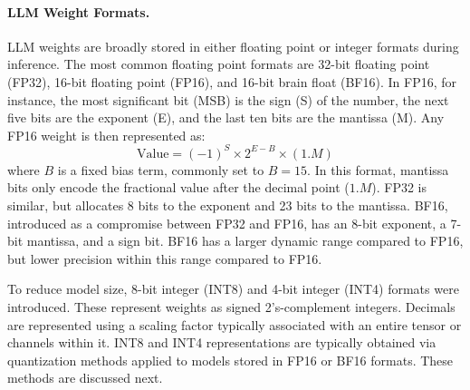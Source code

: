 \paragraph{LLM Weight Formats.} LLM weights are broadly stored in either floating point or integer formats during inference.
The most common floating point formats are 32-bit floating point (FP32), 16-bit floating point (FP16), and 16-bit brain float (BF16). 
In FP16, for instance, the most significant bit (MSB) is the {sign} (S) of the number, the next five bits are the {exponent} (E), and the last ten bits are the {mantissa} (M). 
Any FP16 weight is then represented as: %
\begin{equation}
    \text{Value} = (-1)^S \times 2^{E-B} \times (1.M)
\end{equation}
where $B$ is a fixed bias term, commonly set to $B=15$. In this format, mantissa bits only encode 
the fractional value after the decimal point ($1.M$).
FP32 is similar, but allocates 8 bits to the exponent and 23 bits to the mantissa. 
BF16, introduced as a compromise between FP32 and FP16, has an 8-bit exponent, 
a 7-bit mantissa, and a sign bit. 
BF16 has a larger dynamic range compared to FP16, but lower precision within this range compared
to FP16.

To reduce model size, 8-bit integer (INT8) and 4-bit integer (INT4) formats were introduced.
These represent weights as 
signed 2's-complement integers. Decimals are represented using 
a scaling factor typically associated with an entire tensor or channels within it.
INT8 and INT4 representations are typically obtained via quantization methods applied to models 
stored in FP16 or BF16 formats. These methods are discussed next.

